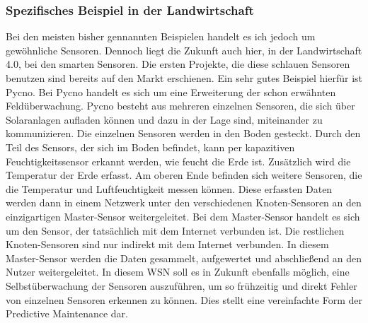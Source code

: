 \documentclass[a4paper,12pt]{scrartcl}
\begin{document}
\subsubsection{Spezifisches Beispiel in der Landwirtschaft}
Bei den meisten bisher gennannten Beispielen handelt es ich jedoch um gewöhnliche Sensoren. Dennoch liegt die Zukunft auch hier, in der Landwirtschaft 4.0, bei den smarten Sensoren.
Die ersten Projekte, die diese schlauen Sensoren benutzen sind bereits auf den Markt erschienen. Ein sehr gutes Beispiel hierfür ist Pycno. Bei Pycno handelt es sich um eine Erweiterung der schon erwähnten Feldüberwachung. 
Pycno besteht aus mehreren einzelnen Sensoren, die sich über Solaranlagen aufladen können und dazu in der Lage sind, miteinander zu kommunizieren. Die einzelnen Sensoren werden in den Boden gesteckt. Durch den Teil des Sensors, der sich im Boden befindet, kann per kapazitiven Feuchtigkeitssensor erkannt werden, wie feucht die Erde ist. Zusätzlich wird die Temperatur der Erde erfasst. Am oberen Ende befinden sich weitere Sensoren, die die Temperatur und Luftfeuchtigkeit messen können. Diese erfassten Daten werden dann in einem Netzwerk unter den verschiedenen Knoten-Sensoren an den einzigartigen Master-Sensor weitergeleitet. Bei dem Master-Sensor handelt es sich um den Sensor, der tatsächlich mit dem Internet verbunden ist. Die restlichen Knoten-Sensoren sind nur indirekt mit dem Internet verbunden. In diesem Master-Sensor werden die Daten gesammelt, aufgewertet und abschließend an den Nutzer weitergeleitet.
In diesem WSN soll es in Zukunft ebenfalls möglich, eine Selbstüberwachung der Sensoren auszuführen, um so frühzeitig und direkt Fehler von einzelnen Sensoren erkennen zu können. Dies stellt eine vereinfachte Form der Predictive Maintenance dar.
\cite{https://pycno.co/quick-start Stand 14.02.2019, 14:00 Uhr }
\end{document}
